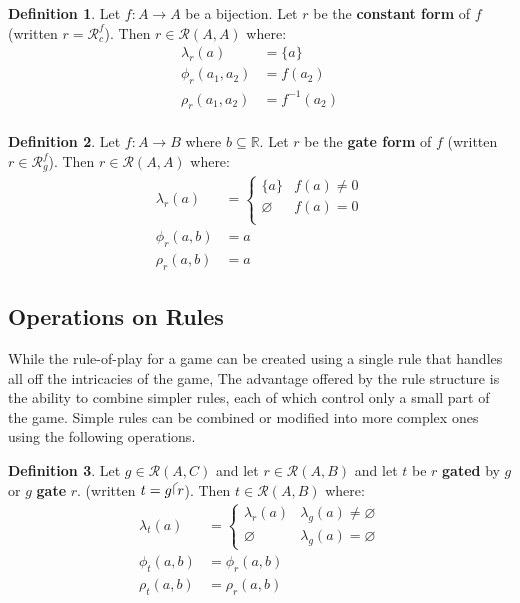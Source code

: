 \documentclass{article}
\theoremstyle{definition}
\newtheorem{definition}{Definition}[subsection]
\theoremstyle{plain}
\def\rule{\mathcal{R}}
\newcommand{\gate}{\mathopen{\; \mathclap{\tikz{
  \draw (0, -0.35em) -- (0, 0.30em);
  \draw (0,  0.30em) -- (0.30em, 0.50em);
}}\; \!}}
\begin{document}
\begin{definition}
  Let $ f : A \rightarrow A $ be a bijection.
  Let $ r $ be the \textbf{constant form} of $ f $
  (written $ r = \rule_c^f $).
  Then $ r \in \rule (A, A) $ where:
  \begin{align}
    \lambda_r (a)        & = \{ a \} \\
       \phi_r (a_1, a_2) & = f (a_2) \\
       \rho_r (a_1, a_2) & = f^{-1} (a_2) \\
  \end{align}
\end{definition}

\begin{definition}
  Let $ f : A \rightarrow B $ where $ b \subseteq \mathbb{R} $.
  Let $ r $ be the \textbf{gate form} of $ f $
  (written $ r \in \rule_g^f $).
  Then $ r \in \rule (A, A) $ where:
  \begin{align}
    \lambda_r (a)    & = \begin{cases}
                           \{ a \}     & f (a) \neq 0 \\
                           \varnothing & f (a) =    0 \\
                         \end{cases} \\
       \phi_r (a, b) & = a \\
       \rho_r (a, b) & = a
  \end{align}
\end{definition}

\subsection{Operations on Rules} %

While the rule-of-play for a game can be created using a single rule
that handles all off the intricacies of the game,
The advantage offered by the rule structure
is the ability to combine simpler rules,
each of which control only a small part of the game.
Simple rules can be combined or modified into more complex ones using the following operations.

\begin{definition}
  Let $ g \in \rule (A, C) $ and
  let $ r \in \rule (A, B) $ and
  let $ t $ be $ r $ \textbf{gated} by $ g $
  or $ g $ \textbf{gate} $ r $.
  (written $ t = g \gate r $).
  Then $ t \in \rule (A, B) $ where:
  \begin{align}
    \lambda_t (a) & = \begin{cases}
                         \lambda_r (a) & \lambda_g (a) \neq \varnothing \\
                         \varnothing & \lambda_g (a) = \varnothing
                      \end{cases} \\
    \phi_t (a, b) & = \phi_r (a, b) \\
    \rho_t (a, b) & = \rho_r (a, b)
  \end{align}
\end{definition}
\end{document}
